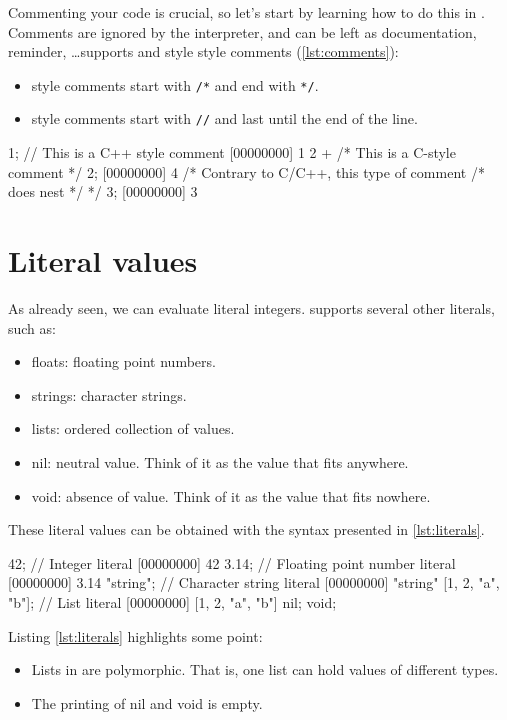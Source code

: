 \documentclass[openright,twoside,12pt]{report}
\begin{document}
Commenting your code is crucial, so let's start by learning how to do
this in \urbi. Comments are ignored by the interpreter, and
can be left as documentation, reminder, \ldots \urbi supports \C and
\Cxx style style comments (\autoref{lst:comments}):

\begin{itemize}
\item \C style comments start with \texttt{/*} and end with \texttt{*/}.
\item \Cxx style comments start with \texttt{//} and last until the
  end of the line.
\end{itemize}


\begin{urbiscript}[caption=Comments in \urbi, label=lst:comments]
1; // This is a C++ style comment
[00000000] 1
2 + /* This is a C-style comment */ 2;
[00000000] 4
/* Contrary to C/C++, this type of comment /* does nest */ */
3;
[00000000] 3
\end{urbiscript}


\section{Literal values}

As already seen, we can evaluate literal integers. \urbi supports
several other literals, such as:

\begin{itemize}
\item floats: floating point numbers.
\item strings: character strings.
\item lists: ordered collection of values.
\item nil: neutral value. Think of it as the value that fits anywhere.
\item void: absence of value. Think of it as the value that fits nowhere.
\end{itemize}

These literal values can be obtained with the syntax presented in
\autoref{lst:literals}.

\begin{urbiscript}[caption=Literals,label=lst:literals]
42; // Integer literal
[00000000] 42
3.14; // Floating point number literal
[00000000] 3.14
"string"; // Character string literal
[00000000] "string"
[1, 2, "a", "b"]; // List literal
[00000000] [1, 2, "a", "b"]
nil;
void;
\end{urbiscript}

Listing \ref{lst:literals} highlights some point:
\begin{itemize}
\item Lists in \urbi are polymorphic. That is, one list can hold
  values of different types.
\item The printing of nil and void is empty.
\end{itemize}
\end{document}
